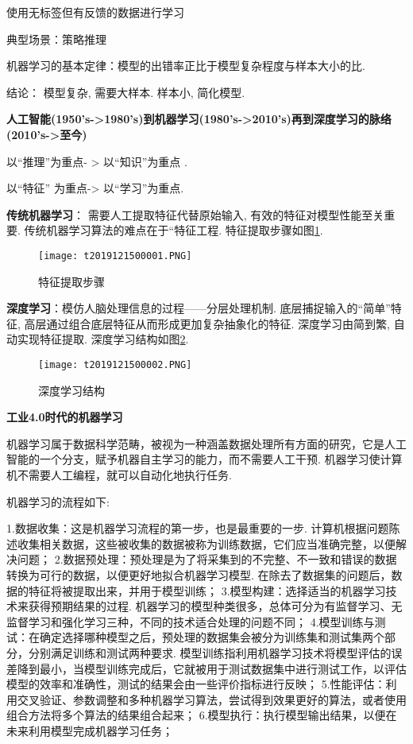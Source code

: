 \begin{tcolorbox}[colback=white!50,colframe=orange!50,title=强化学习( Reinforcement learning)]
\begin{center}
使用无标签但有反馈的数据进行学习

典型场景：策略推理
\hfill
\end{center}
\end{tcolorbox}

机器学习的基本定律：模型的出错率正比于模型复杂程度与样本大小的比.

结论： 模型复杂, 需要大样本. 样本小, 简化模型.

\textbf{人工智能(1950's->1980's)到机器学习(1980's->2010's)再到深度学习的脉络(2010's->至今)}
\begin{center}
以“推理”为重点- > 以“知识”为重点 .

以“特征” 为重点-> 以“学习”为重点.
\end{center}

\textbf{传统机器学习}： 需要人工提取特征代替原始输入, 有效的特征对模型性能至关重要. 传统机器学习算法的难点在于“特征工程. 特征提取步骤如图\ref{AI32fig2019121501}.
\begin{figure}[H]
\centering
\texttt{[image: t2019121500001.PNG]}
\caption{特征提取步骤}
\label{AI32fig2019121501}
\end{figure}

\textbf{深度学习}：模仿人脑处理信息的过程——分层处理机制. 底层捕捉输入的“简单”特征, 高层通过组合底层特征从而形成更加复杂抽象化的特征. 深度学习由简到繁, 自动实现特征提取. 深度学习结构如图\ref{AI32fig2019121502}.
\begin{figure}[H]
\centering
\texttt{[image: t2019121500002.PNG]}
\caption{深度学习结构}
\label{AI32fig2019121502}
\end{figure}
\textbf{工业4.0时代的机器学习}

机器学习属于数据科学范畴，被视为一种涵盖数据处理所有方面的研究，它是人工智能的一个分支，赋予机器自主学习的能力，而不需要人工干预. 机器学习使计算机不需要人工编程，就可以自动化地执行任务.

机器学习的流程如下:

1.数据收集：这是机器学习流程的第一步，也是最重要的一步. 计算机根据问题陈述收集相关数据，这些被收集的数据被称为训练数据，它们应当准确完整，以便解决问题；
2.数据预处理：预处理是为了将采集到的不完整、不一致和错误的数据转换为可行的数据，以便更好地拟合机器学习模型. 在除去了数据集的问题后，数据的特征将被提取出来，并用于模型训练；
3.模型构建：选择适当的机器学习技术来获得预期结果的过程. 机器学习的模型种类很多，总体可分为有监督学习、无监督学习和强化学习三种，不同的技术适合处理的问题不同；
4.模型训练与测试：在确定选择哪种模型之后，预处理的数据集会被分为训练集和测试集两个部分，分别满足训练和测试两种要求. 模型训练指利用机器学习技术将模型评估的误差降到最小，当模型训练完成后，它就被用于测试数据集中进行测试工作，以评估模型的效率和准确性，测试的结果会由一些评价指标进行反映；
5.性能评估：利用交叉验证、参数调整和多种机器学习算法，尝试得到效果更好的算法，或者使用组合方法将多个算法的结果组合起来；
6.模型执行：执行模型输出结果，以便在未来利用模型完成机器学习任务；

